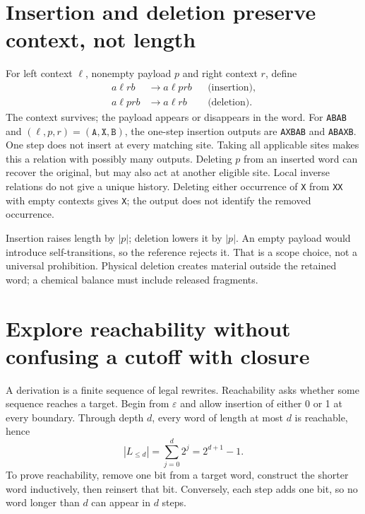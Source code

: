 \section{Insertion and deletion preserve context, not length}
For left context $\ell$, nonempty payload $p$ and right context $r$, define
\begin{align}
 a\ell r b&\longrightarrow a\ell p r b &&\text{(insertion)},\\
 a\ell p r b&\longrightarrow a\ell r b &&\text{(deletion)}.
 \label{eq:delete}
\end{align}
The context survives; the payload appears or disappears in the word.
For \texttt{ABAB} and $(\ell,p,r)=(\texttt{A},\texttt{X},\texttt{B})$,
the one-step insertion outputs are \texttt{AXBAB} and \texttt{ABAXB}.
One step does not insert at every matching site.
Taking all applicable sites makes this a relation with possibly many outputs.
Deleting $p$ from an inserted word can recover the original, but may also act
at another eligible site. Local inverse relations do not give a unique history.
Deleting either occurrence of \texttt{X} from \texttt{XX} with empty contexts
gives \texttt{X}; the output does not identify the removed occurrence.

Insertion raises length by $|p|$; deletion lowers it by $|p|$. An empty payload
would introduce self-transitions, so the reference rejects it. That is a scope
choice, not a universal prohibition. Physical deletion creates material outside
the retained word; a chemical balance must include released fragments.

\section{Explore reachability without confusing a cutoff with closure}
A derivation is a finite sequence of legal rewrites. Reachability asks whether
some sequence reaches a target. Begin from $\varepsilon$ and allow insertion
of either 0 or 1 at every boundary. Through depth $d$, every word of length at
most $d$ is reachable, hence
\begin{equation}
 |L_{\leq d}|=\sum_{j=0}^{d}2^j=2^{d+1}-1.
 \label{eq:growth}
\end{equation}
To prove reachability, remove one bit from a target word, construct the shorter
word inductively, then reinsert that bit. Conversely, each step adds one bit,
so no word longer than $d$ can appear in $d$ steps.

